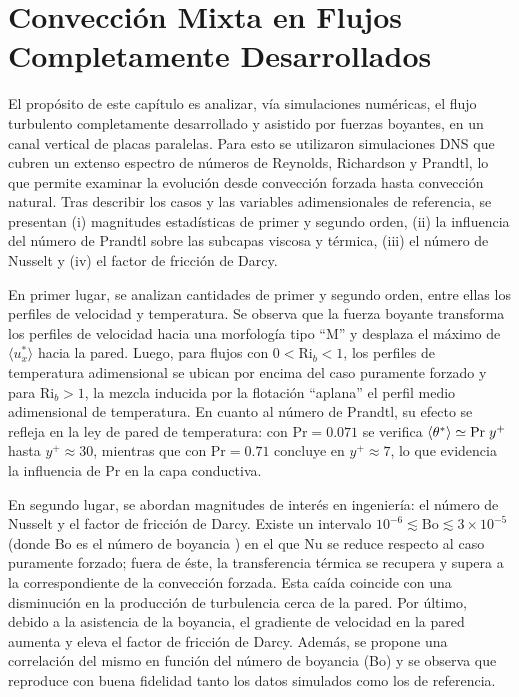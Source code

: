 \chapter{Convección Mixta en Flujos Completamente Desarrollados} \label{cap:desarrollado}

El propósito de este capítulo es analizar, vía simulaciones numéricas, el flujo turbulento completamente desarrollado y asistido por fuerzas boyantes, en un canal vertical de placas paralelas. Para esto se utilizaron simulaciones DNS que cubren un extenso espectro de números de Reynolds, Richardson y Prandtl, lo que permite examinar la evolución desde convección forzada hasta convección natural. Tras describir los casos y las variables adimensionales de referencia, se presentan (i) magnitudes estadísticas de primer y segundo orden, (ii) la influencia del número de Prandtl sobre las subcapas viscosa y térmica, (iii) el número de Nusselt y (iv) el factor de fricción de Darcy.

En primer lugar, se analizan cantidades de primer y segundo orden, entre ellas los perfiles de velocidad y temperatura. Se observa que la fuerza boyante transforma los perfiles de velocidad hacia una morfología tipo “M” y desplaza el máximo de $\langle u_x^* \rangle$ hacia la pared. Luego, para flujos con $0 < \text{Ri}_b < 1$, los perfiles de temperatura adimensional se ubican por encima del caso puramente forzado y para $\text{Ri}_b>1$, la mezcla inducida por la flotación “aplana” el perfil medio adimensional de temperatura. En cuanto al número de Prandtl, su efecto se refleja en la ley de pared de temperatura: con $\text{Pr}=0\text{.}071$ se verifica $\langle \theta^{*} \rangle \simeq \text{Pr} \hspace{1mm} y^+$ hasta $y^+ \approx 30$, mientras que con $\text{Pr}=0\text{.}71$ concluye en $y^+ \approx 7$, lo que evidencia la influencia de $\text{Pr}$ en la capa conductiva. 

En segundo lugar, se abordan magnitudes de interés en ingeniería: el número de Nusselt y el factor de fricción de Darcy. Existe un intervalo $10^{-6} \lesssim \text{Bo} \lesssim 3\times10^{-5}$ (donde Bo es el número de boyancia \cite{jackson1989studies}) en el que $\text{Nu}$ se reduce respecto al caso puramente forzado; fuera de éste, la transferencia térmica se recupera y supera a la correspondiente de la convección forzada. Esta caída coincide con una disminución en la producción de turbulencia cerca de la pared. Por último, debido a la asistencia de la boyancia, el gradiente de velocidad en la pared aumenta y eleva el factor de fricción de Darcy. Además, se propone una correlación del mismo en función del número de boyancia (Bo) y se observa que reproduce con buena fidelidad tanto los datos simulados como los de referencia.



